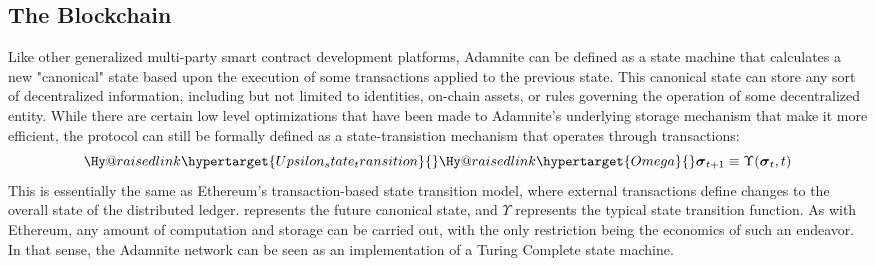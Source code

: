 \documentclass[conference]{IEEEtran}
\makeatletter
\newcommand{\linkdest}[1]{\Hy@raisedlink{\hypertarget{#1}{}}}
\makeatother
\begin{document}
\subsection{The Blockchain}
Like other generalized multi-party smart contract development platforms, Adamnite can be defined as a state machine that calculates a new "canonical" state based upon the execution of some transactions applied to the previous state. This canonical state can store any sort of decentralized information, including but not limited to identities, on-chain assets, or rules governing the operation of some decentralized entity. While there are certain low level optimizations that have been made to Adamnite's underlying storage mechanism that make it more efficient, the protocol can still be formally defined as a state-transistion mechanism that operates through transactions:
\begin{equation}
\linkdest{Upsilon_state_transition}\linkdest{Omega}\boldsymbol{\sigma}_{t+1} \equiv \Upsilon(\boldsymbol{\sigma}_{t}, t)
\end{equation}
This is essentially the same as Ethereum's transaction-based state transition model, where external transactions define changes to the overall state of the distributed ledger. \boldsymbol{\omega} represents the future canonical state, and $\Upsilon$ represents the typical state transition function. As with Ethereum, any amount of computation and storage can be carried out, with the only restriction being the economics of such an endeavor. In that sense, the Adamnite network can be seen as an implementation of a Turing Complete state machine.
\end{document}
